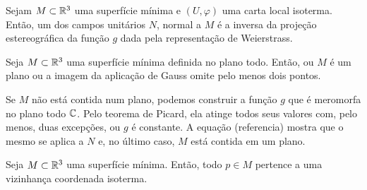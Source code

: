 \begin{proposicao}
	Sejam $M \subset \mathbb{R}^3$ uma superfície mínima e $(U, \varphi)$ uma carta local isoterma. Então, um dos campos unitários $N$, normal a $M$ é a inversa da projeção estereográfica da função $g$ dada pela representação de Weierstrass.
\end{proposicao}

\begin{corolario}
	Seja $M \subset \mathbb{R}^3$ uma superfície mínima definida no plano todo. Então, ou $M$ é um plano ou a imagem da aplicação de Gauss omite pelo menos dois pontos.
\end{corolario}

\begin{demonstracao}
	Se $M$ não está contida num plano, podemos construir a função $g$ que é meromorfa no plano todo $\mathbb{C}$. Pelo teorema de Picard, ela atinge todos seus valores com, pelo menos, duas excepções, ou $g$ é constante. A equação (referencia) mostra que o mesmo se aplica a $N$ e, no último caso, $M$ está contida em um plano.
\end{demonstracao}

\begin{teorema}
	Seja $M \subset \mathbb{R}^3$ uma superfície mínima. Então, todo $p \in M$ pertence a uma vizinhança coordenada isoterma.
\end{teorema}

